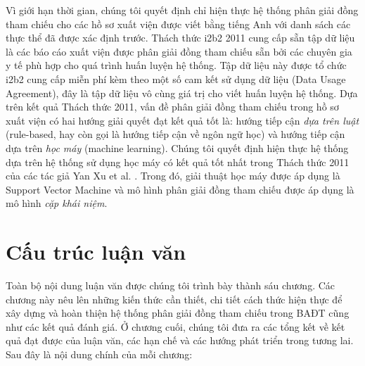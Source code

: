 Vì giới hạn thời gian, chúng tôi quyết định chỉ hiện thực hệ thống phân giải đồng tham chiếu cho các hồ sơ xuất viện được viết bằng tiếng Anh với danh sách các thực thể đã được xác định trước. Thách thức i2b2 2011 cung cấp sẵn tập dữ liệu là các báo cáo xuất viện được phân giải đồng tham chiếu sẵn bởi các chuyên gia y tế phù hợp cho quá trình huấn luyện hệ thống. Tập dữ liệu này được tổ chức i2b2 cung cấp miễn phí kèm theo một số cam kết sử dụng dữ liệu (Data Usage Agreement), đây là tập dữ liệu vô cùng giá trị cho viết huấn luyện hệ thống. Dựa trên kết quả Thách thức 2011, vấn đề phân giải đồng tham chiếu trong hồ sơ xuất viện có hai hướng giải quyết đạt kết quả tốt là: hướng tiếp cận \emph{dựa trên luật} (rule-based, hay còn gọi là hướng tiếp cận về ngôn ngữ học) và hướng tiếp cận dựa trên \emph{học máy} (machine learning). Chúng tôi quyết định hiện thực hệ thống dựa trên hệ thống sử dụng học máy có kết quả tốt nhất trong Thách thức 2011 của các tác giả Yan Xu et al. \cite{YanXu2012}. Trong đó, giải thuật học máy được áp dụng là Support Vector Machine và mô hình phân giải đồng tham chiếu được áp dụng là mô hình \emph{cặp khái niệm}.

\section{Cấu trúc luận văn}
Toàn bộ nội dung luận văn được chúng tôi trình bày thành sáu chương. Các chương này nêu lên những kiến thức cần thiết, chi tiết cách thức hiện thực để xây dựng và hoàn thiện hệ thống phân giải đồng tham chiếu trong BAĐT cũng như các kết quả đánh giá. Ở chương cuối, chúng tôi đưa ra các tổng kết về kết quả đạt được của luận văn, các hạn chế và các hướng phát triển trong tương lai. Sau đây là nội dung chính của mỗi chương:

